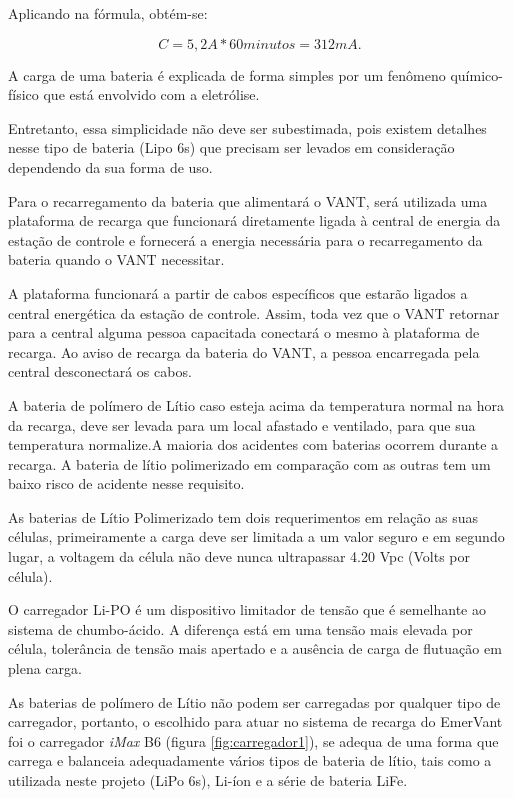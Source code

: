 Aplicando na fórmula, obtém-se: 

\begin{equation}
C= 5,2A* 60 minutos = 312mA.
\end{equation}


A carga de uma bateria é explicada de forma simples por um fenômeno químico-físico que está envolvido com a eletrólise. \cite{gibbs}

Entretanto, essa simplicidade não deve ser subestimada, pois existem detalhes nesse tipo de bateria (Lipo 6s) que precisam ser levados em consideração dependendo da sua forma de uso.

Para o recarregamento da bateria que alimentará o VANT, será utilizada uma plataforma de recarga que funcionará diretamente ligada à  central de energia da estação de controle e fornecerá a energia necessária para o recarregamento da bateria quando o VANT necessitar.

A plataforma funcionará a partir de cabos específicos que estarão ligados a central energética da estação de controle. Assim, toda vez que o VANT retornar para a central alguma pessoa capacitada conectará o mesmo à plataforma de recarga. Ao aviso de recarga da bateria do VANT, a pessoa encarregada pela central desconectará os cabos.

A bateria de polímero de Lítio caso esteja acima da temperatura normal na hora da recarga, deve ser levada para um local afastado e ventilado, para que sua temperatura normalize.A maioria dos acidentes com baterias ocorrem durante a recarga. A bateria de lítio polimerizado em comparação com as outras tem um baixo risco de acidente nesse requisito. \cite{gibbs}

As baterias de Lítio Polimerizado tem dois requerimentos em relação as suas células, primeiramente a carga deve ser limitada a um valor seguro e em segundo lugar, a voltagem da célula não deve nunca ultrapassar 4.20 Vpc (Volts por célula). \cite{gibbs}

O carregador Li-PO é um dispositivo limitador de tensão que é semelhante ao sistema de chumbo-ácido. A diferença está em uma tensão mais elevada por célula, tolerância de tensão mais apertado e a ausência de carga de flutuação em plena carga.

As baterias de polímero de Lítio não podem ser carregadas por qualquer tipo de carregador, portanto, o escolhido para atuar no 
sistema de recarga do EmerVant foi o carregador \textit{iMax} B6 (figura \ref{fig:carregador1}), se adequa de uma forma que carrega e 
balanceia adequadamente vários tipos de bateria de lítio, tais como a utilizada neste projeto (LiPo 6s), Li-íon e a série de bateria LiFe.


